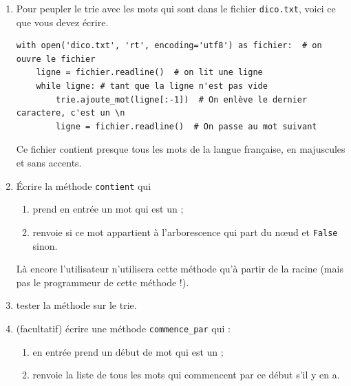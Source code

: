 \documentclass[a4paper,12pt,french]{article}
\begin{document}
\begin{exercice}[ : Trie]
\begin{enumerate}[\bfseries 1.]
    \item Pour peupler le trie avec les mots qui sont dans le fichier \texttt{dico.txt}, voici ce que vous devez écrire.
    
    \begin{verbatim}
with open('dico.txt', 'rt', encoding='utf8') as fichier:  # on ouvre le fichier
    ligne = fichier.readline()  # on lit une ligne
    while ligne: # tant que la ligne n'est pas vide
        trie.ajoute_mot(ligne[:-1])  # On enlève le dernier caractere, c'est un \n
        ligne = fichier.readline()  # On passe au mot suivant
    \end{verbatim}
    
    Ce fichier contient presque tous les mots de la langue française, en majuscules et sans accents. 
	\item 	\'Ecrire la méthode \texttt{contient} qui
  \begin{enumerate}[--]
    	\item 	prend en entrée un mot qui est un ;
    	\item 	renvoie  si ce mot appartient à l'arborescence qui part du n\oe ud et \texttt{False} sinon.
    \end{enumerate}
    Là encore l'utilisateur n'utilisera cette méthode qu'à partir de la racine (mais pas le programmeur de cette méthode !).
    \item tester la méthode sur le trie.
    \item (facultatif) écrire une méthode \texttt{commence\_par} qui :
     \begin{enumerate}[--]
     	\item 	en entrée prend un début de mot qui est un ;
     	\item 	renvoie la liste de tous les mots qui commencent par ce	début s'il y en a.
     \end{enumerate}
\end{enumerate}
\end{exercice}
\end{document}
